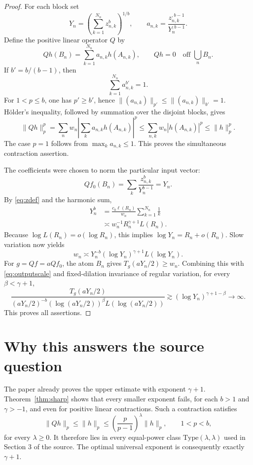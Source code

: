 \documentclass[11pt]{article}
\newcommand{\ellf}{\ell}
\newcommand{\Tp}[1]{T_{#1}}
\begin{document}
\begin{proof}
For each block set
\[
 Y_n=\left(\sum_{k=1}^{N_n}z_{n,k}^b\right)^{1/b},
 \qquad
 a_{n,k}=\frac{z_{n,k}^{,b-1}}{Y_n^{,b-1}}.
\]
Define the positive linear operator \(Q\) by
\[
 Qh(B_n)=\sum_{k=1}^{N_n}a_{n,k}h(A_{n,k}),
 \qquad Qh=0\quad\text{off }\bigcup_n B_n.
\]
If \(b'=b/(b-1)\), then
\[
 \sum_{k=1}^{N_n}a_{n,k}^{b'}=1.
\]
For \(1<p\le b\), one has \(p'\ge b'\), hence
\(\|(a_{n,k})\|_{p'}\le\|(a_{n,k})\|_{b'}=1\).  Hölder's inequality,
followed by summation over the disjoint blocks, gives
\[
 \|Qh\|_p^p
 =\sum_n w_n\left|\sum_k a_{n,k}h(A_{n,k})\right|^p
 \le\sum_{n,k}w_n|h(A_{n,k})|^p
 \le\|h\|_p^p.
\]
The case \(p=1\) follows from \(\max_k a_{n,k}\le1\).  This proves the
simultaneous contraction assertion.

The coefficients were chosen to norm the particular input vector:
\[
 Qf_0(B_n)=\sum_k\frac{z_{n,k}^{b}}{Y_n^{b-1}}=Y_n.
\]
By \eqref{eq:zdef} and the harmonic sum,
\begin{align*}
 Y_n^b
 &=\frac{c_0\ellf(R_n)}{w_n}
   \sum_{k=1}^{N_n}\frac1k\\
 &\asymp w_n^{-1}R_n^{\gamma+1}L(R_n).
\end{align*}
Because \(\log L(R_n)=o(\log R_n)\), this implies
\(\log Y_n=R_n+o(R_n)\).  Slow variation now yields
\begin{equation}\label{eq:outputscale}
 w_n\asymp
 Y_n^{-b}(\log Y_n)^{\gamma+1}L(\log Y_n).
\end{equation}
For \(g=Qf=aQf_0\), the atom \(B_n\) gives
\(\Tp g(aY_n/2)\ge w_n\).  Combining this with
\eqref{eq:outputscale} and fixed-dilation invariance of regular variation,
for every \(\beta<\gamma+1\),
\[
 \frac{\Tp g(aY_n/2)}
 {(aY_n/2)^{-b}(\log(aY_n/2))^\beta L(\log(aY_n/2))}
 \gtrsim (\log Y_n)^{\gamma+1-\beta}\longrightarrow\infty.
\]
This proves all assertions.
\end{proof}

\section{Why this answers the source question}

The paper already proves the upper estimate with exponent \(\gamma+1\).
Theorem~\ref{thm:sharp} shows that every smaller exponent fails, for each
\(b>1\) and \(\gamma>-1\), and even for positive linear contractions.  Such a
contraction satisfies
\[
 \|Qh\|_p\le \|h\|_p
 \le \left(\frac p{p-1}\right)^\lambda\|h\|_p,
 \qquad 1<p<b,
\]
for every \(\lambda\ge0\).  It therefore lies in every equal-power class
\(\mathrm{Type}(\lambda,\lambda)\) used in Section 3 of the source.  The
optimal universal exponent is consequently exactly \(\gamma+1\).
\end{document}
